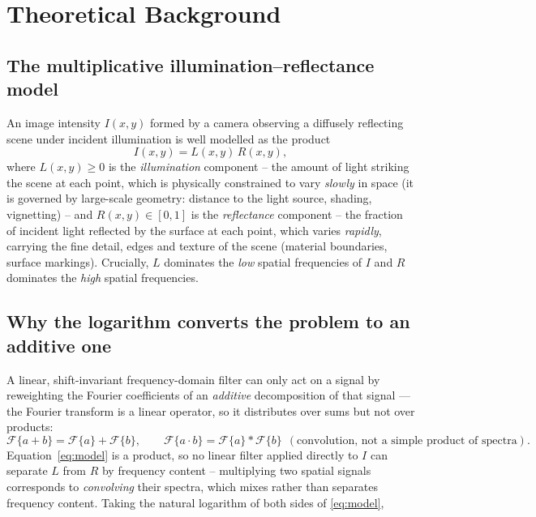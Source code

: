 \documentclass[11pt]{article}
\begin{document}
\section{Theoretical Background}

\subsection{The multiplicative illumination--reflectance model}

An image intensity $I(x,y)$ formed by a camera observing a diffusely reflecting scene
under incident illumination is well modelled as the product
\begin{equation}
  I(x,y) = L(x,y)\,R(x,y),
  \label{eq:model}
\end{equation}
where $L(x,y) \ge 0$ is the \emph{illumination} component -- the amount of light
striking the scene at each point, which is physically constrained to vary
\emph{slowly} in space (it is governed by large-scale geometry: distance to the light
source, shading, vignetting) -- and $R(x,y) \in [0,1]$ is the \emph{reflectance}
component -- the fraction of incident light reflected by the surface at each point,
which varies \emph{rapidly}, carrying the fine detail, edges and texture of the scene
(material boundaries, surface markings). Crucially, $L$ dominates the \emph{low}
spatial frequencies of $I$ and $R$ dominates the \emph{high} spatial frequencies.

\subsection{Why the logarithm converts the problem to an additive one}

A linear, shift-invariant frequency-domain filter can only act on a signal by
reweighting the Fourier coefficients of an \emph{additive} decomposition of that
signal --- the Fourier transform is a linear operator, so it distributes over sums but
not over products:
\[
  \mathcal{F}\{a+b\} = \mathcal{F}\{a\}+\mathcal{F}\{b\}, \qquad
  \mathcal{F}\{a\cdot b\} = \mathcal{F}\{a\}\ast\mathcal{F}\{b\} \ \ (\text{convolution, not a simple product of spectra}).
\]
Equation~\eqref{eq:model} is a product, so no linear filter applied directly to $I$ can
separate $L$ from $R$ by frequency content -- multiplying two spatial signals
corresponds to \emph{convolving} their spectra, which mixes rather than separates
frequency content. Taking the natural logarithm of both sides of \eqref{eq:model},
\end{document}
